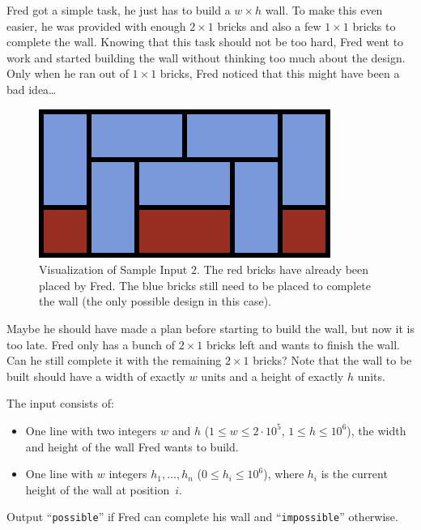 \problemname{\problemyamlname}
%
Fred got a simple task, he just has to build a $w\times h$ wall.
To make this even easier, he was provided with enough $2\times1$ bricks and also a few $1\times1$ bricks to complete the wall.
Knowing that this task should not be too hard, Fred went to work and started building the wall without thinking too much about the design.
Only when he ran out of $1\times1$ bricks, Fred noticed that this might have been a bad idea\dots

\begin{figure}[h]
	\centering
	\includegraphics{sample}
	\caption{Visualization of Sample Input $2$.
	The red bricks have already been placed by Fred.
	The blue bricks still need to be placed to complete the wall (the only possible design in this case).}
\end{figure}
	
Maybe he should have made a plan before starting to build the wall, but now it is too late.
Fred only has a bunch of $2\times1$ bricks left and wants to finish the wall.
Can he still complete it with the remaining $2\times 1$ bricks?
Note that the wall to be built should have a width of exactly $w$ units and a height of exactly $h$ units.

\begin{Input}
	The input consists of:
	\begin{itemize}
		\item One line with two integers $w$ and $h$ ($1\leq w\leq2\cdot10^5$, $1\leq h\leq10^6$), the width and height of the wall Fred wants to build.
		\item One line with $w$ integers $h_1,\dots,h_n$ ($0\leq h_i\leq 10^6$), where $h_i$ is the current height of the wall at position~$i$.
	\end{itemize}
\end{Input}

\begin{Output}
	Output ``\texttt{possible}'' if Fred can complete his wall and ``\texttt{impossible}'' otherwise.
\end{Output}
